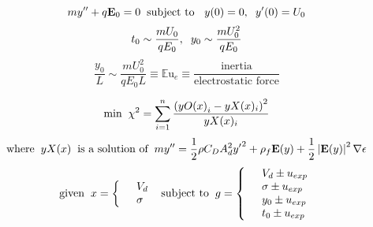 \documentclass[10pt,a4paper]{article}
\author{Erin Schmidt}
\begin{document}
\[ m y'' + q \mathbf{E}_0 = 0 \hspace{2 mm} \mbox{subject to } \hspace{2 mm} y(0) = 0, \hspace{2 mm} y'(0) = U_0 \] 
\[ t_0 \sim \frac{m U_0}{q E_0}, \hspace{2 mm} y_0 \sim \frac{m U_0^2}{q E_0}\]
\[\frac{y_0}{L} \sim \frac{m U_0^2}{q E_0 L} \equiv {\mathbb{E}\mbox{u}}_e \equiv \frac{\mbox{inertia}}{\mbox{electrostatic force}}\]

\newpage
\begin{equation*}
\mbox{min} \hspace{2 mm} \chi^2 = \sum^n_{i=1} \frac{\left({yO(x)}_i - yX(x)_i \right)^2}{yX(x)_i}
\end{equation*}
\[\mbox{where} \hspace{2 mm} yX(x) \hspace{2 mm} \mbox{is a solution of} \hspace{2 mm} m y'' = \frac{1}{2} \rho C_D A_d^2 {y'}^2 + \rho_f \mathbf{E}(y) + \frac{1}{2} \left| \mathbf{E}(y) \right|^2 \nabla \epsilon\]
\begin{eqnarray*} \mbox{given} \hspace{2 mm} \begin{split}x = \left\{ \begin{array}{ll}      & V_d\\
          & \sigma 
          \end{array} \right. 
          \end{split} \hspace{2 mm} \mbox{subject to} \hspace{2 mm} \begin{split}
          g = \left\{ \begin{array}{ll}
          & V_d \pm u_{exp}\\
      	  & \sigma \pm u_{exp}\\
      	  & y_0 \pm u_{exp}\\
      	  & t_0 \pm u_{exp}\\
          \end{array} \right. 
          \end{split}
\end{eqnarray*}
\end{document}
